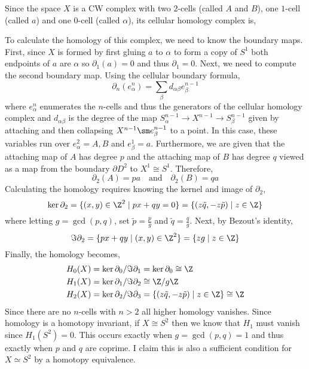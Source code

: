 \documentclass[12pt]{extarticle}
\begin{document}
Since the space $X$ is a CW complex with two $2$-cells (called $A$ and $B$), one $1$-cell (called $a$) and one $0$-cell (called $\alpha$), its cellular homology complex is,
\begin{center}
\end{center}
To calculate the homology of this complex, we need to know the boundary maps. First, since $X$ is formed by first gluing $a$ to $\alpha$ to form a copy of $S^1$ both endpoints of $a$ are $\alpha$ so $\partial_1(a) = 0$ and thus $\partial_1 = 0$. Next, we need to compute the second boundary map. Using the cellular boundary formula,
\[ \partial_n(e_{\alpha}^n) = \sum_{\beta} d_{\alpha \beta} e_{\beta}^{n-1} \]
where $e_{\alpha}^n$ enumerates the $n$-cells and thus the generators of the cellular homology complex and $d_{\alpha \beta}$ is the degree of the map $S_{\alpha}^{n-1} \to X^{n-1} \to S_{\beta}^{n-1}$ given by attaching and then collapsing $X^{n-1} \sm e_{\beta}^{n-1}$ to a point. In this case, these variables run over $e_{\alpha}^2 = A, B$ and $e_{\beta}^1 = a$. Furthermore, we are given that the attaching map of $A$ has degree $p$ and the attaching map of $B$ has degree $q$ viewed as a map from the boundary $\partial D^2$ to $X^1 \cong S^1$. Therefore,
\[ \partial_2 (A) = p a \quad \text{and} \quad \partial_2(B) = q a \]
Calculating the homology requires knowing the kernel and image of $\partial_2$,
\[ \ker{\partial_2} = \{ (x,y) \in \Z^2 \mid px + qy = 0 \} = \{ (z \tilde{q}, -z\tilde{p}) \mid z \in \Z \} \]
where letting $g = \gcd{(p,q)}$, set $\tilde{p} = \frac{p}{g}$ and $\tilde{q} = \frac{q}{g}$. Next, by Bezout's identity,
\[ \Im{\partial_2} = \{ px + qy \mid (x,y) \in \Z^2 \} = \{ zg \mid z \in \Z \} \] 
Finally, the homology becomes,
\begin{align*}
H_0(X) &= \ker{\partial_0} / \Im{\partial_1} = \ker{\partial_0} \cong \Z
\\
H_1(X) & = \ker{\partial_1} / \Im{\partial_2} \cong \Z / g \Z
\\
H_2(X) & = \ker{\partial_2} / \Im{\partial_3} =  \{ (z \tilde{q}, -z\tilde{p}) \mid z \in \Z \}  \cong \Z 
\end{align*}   
Since there are no $n$-cells with $n > 2$ all higher homology vanishes. Since homology is a homotopy invariant, if $X \cong S^2$ then we know that $H_1$ must vanish since $H_1(S^2) = 0$. This occurs exactly when $g = \gcd{(p,q)} = 1$ and thus exactly when $p$ and $q$ are coprime. I claim this is also a sufficient condition for $X \simeq S^2$ by a homotopy equivalence.
\end{document}
